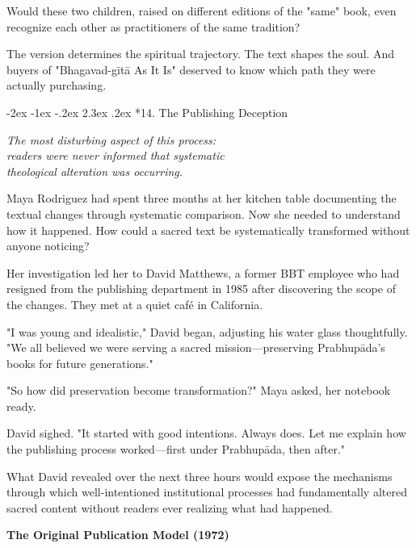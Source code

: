 \documentclass[12pt,twoside]{book}
\makeatletter
\def\cleardoublepage{\clearpage\if@twoside \ifodd\c@page\else\hbox{}\thispagestyle{empty}\newpage\if@twocolumn\hbox{}\newpage\fi\fi\fi}
\renewcommand\section{\@startsection{section}{1}{\z@}%
{-2ex \@plus -1ex \@minus -.2ex}%
{2.3ex \@plus.2ex}%
{\normalfont\Large\bfseries}}
\makeatother
\begin{document}
Would these two children, raised on different editions of the "same" book, even recognize each other as practitioners of the same tradition?

The version determines the spiritual trajectory. The text shapes the soul. And buyers of "Bhagavad-gītā As It Is" deserved to know which path they were actually purchasing.

\cleardoublepage
\vspace*{0.20\textheight}
\section*{14. The Publishing Deception}
\thispagestyle{chapterpage}

{\centering\itshape The most disturbing aspect of this process:\\readers were never informed that systematic\\theological alteration was occurring.\par}
\vspace{0.3cm}

\normalfont\justifying
Maya Rodriguez had spent three months at her kitchen table documenting the textual changes through systematic comparison. Now she needed to understand how it happened. How could a sacred text be systematically transformed without anyone noticing?

Her investigation led her to David Matthews, a former BBT employee who had resigned from the publishing department in 1985 after discovering the scope of the changes. They met at a quiet café in California.

"I was young and idealistic," David began, adjusting his water glass thoughtfully. "We all believed we were serving a sacred mission—preserving Prabhupāda's books for future generations."

"So how did preservation become transformation?" Maya asked, her notebook ready.

David sighed. "It started with good intentions. Always does. Let me explain how the publishing process worked—first under Prabhupāda, then after."

What David revealed over the next three hours would expose the mechanisms through which well-intentioned institutional processes had fundamentally altered sacred content without readers ever realizing what had happened.


\vspace{0.5cm}
\textbf{The Original Publication Model (1972)}
\vspace{0.2cm}
\end{document}

